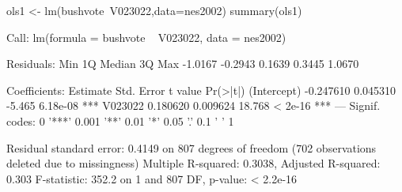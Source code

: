 \begin{Schunk}
\begin{Sinput}
 ols1 <- lm(bushvote~V023022,data=nes2002) 
 summary(ols1)
\end{Sinput}
\begin{Soutput}
Call:
lm(formula = bushvote ~ V023022, data = nes2002)

Residuals:
    Min      1Q  Median      3Q     Max 
-1.0167 -0.2943  0.1639  0.3445  1.0670 

Coefficients:
             Estimate Std. Error t value Pr(>|t|)    
(Intercept) -0.247610   0.045310  -5.465 6.18e-08 ***
V023022      0.180620   0.009624  18.768  < 2e-16 ***
---
Signif. codes:  0 '***' 0.001 '**' 0.01 '*' 0.05 '.' 0.1 ' ' 1

Residual standard error: 0.4149 on 807 degrees of freedom
  (702 observations deleted due to missingness)
Multiple R-squared:  0.3038,	Adjusted R-squared:  0.303 
F-statistic: 352.2 on 1 and 807 DF,  p-value: < 2.2e-16
\end{Soutput}
\end{Schunk}
